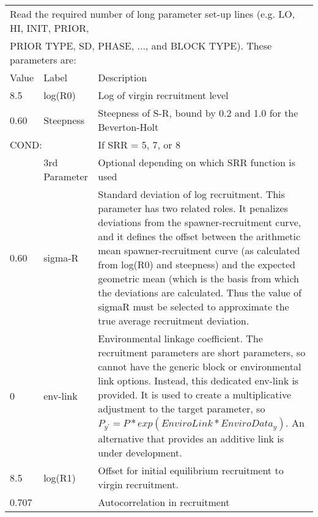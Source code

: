 \begin{center}
	\begin{longtable}{p{1cm} p{3cm} p{11cm}}
		
		
		
	      
		\multicolumn{3}{l}{Read the required number of long parameter set-up lines (e.g. LO, HI, INIT, PRIOR, }\\
		\multicolumn{3}{l}{PRIOR TYPE, SD, PHASE, ..., and BLOCK TYPE).  These parameters are:}\\
		\hline
		Value & Label &  Description\\
		\hline
		8.5 & log(R0) & Log of virgin recruitment level \\
		\hline
		0.60 & Steepness  & Steepness of S-R, bound by 0.2 and 1.0 for the Beverton-Holt \\
		\hline
		\multicolumn{2}{l}{COND:} & If SRR = 5, 7, or 8\\
		& 3rd Parameter & Optional depending on which SRR function is used \\
		\hline
		0.60 & sigma-R &  Standard deviation of log recruitment.
		This parameter has two related roles.  It penalizes deviations from the spawner-recruitment curve, and it defines the offset between the arithmetic mean spawner-recruitment curve (as calculated from log(R0) and steepness) and the expected geometric mean (which is the basis from which the deviations are calculated.  Thus the value of sigmaR must be selected to approximate the true average recruitment deviation.\\
		\hline
		0 & env-link & Environmental linkage coefficient. The recruitment parameters are short parameters, so cannot have the generic block or environmental link options.  Instead, this dedicated env-link is provided.  It is used to create a multiplicative adjustment to the target parameter, so $P_{y’} = P *exp(EnviroLink * EnviroData_{y})$.  An alternative that provides an additive link is under development.\\
		\hline
		8.5 & log(R1) & Offset for initial equilibrium recruitment to virgin recruitment.\\
		\hline
		\multicolumn{2}{l}{0.707} & Autocorrelation in recruitment \\
		\hline
	\end{longtable}
\end{center}


